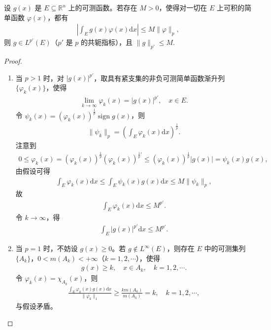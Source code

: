 \documentclass[../../main.tex]{subfiles}%
\begin{document}
\begin{theorem}\label{theorem:实变函数--定理6.19}
设 $g(x)$ 是 $E\subseteq\mathbb{R}^n$ 上的可测函数。若存在 $M>0$，使得对一切在 $E$ 上可积的简单函数 $\varphi(x)$，都有
\begin{align*}
\left| \int_E g(x)\varphi(x)\mathrm{d}x \right| \leqslant M \|\varphi\|_p,
\end{align*}
则 $g\in L^{p'}(E)$（$p'$ 是 $p$ 的共轭指标），且 $\|g\|_{p'}\leqslant M$.
\end{theorem}
\begin{proof}
\begin{enumerate}[(1)]
\item 当 $p>1$ 时，对 $|g(x)|^{p'}$，取具有紧支集的非负可测简单函数渐升列 $\{\varphi_k(x)\}$，使得
\begin{align*}
\lim_{k\to\infty} \varphi_k(x) = |g(x)|^{p'}, \quad x\in E.
\end{align*}
令 $\psi_k(x)=(\varphi_k(x))^{\frac{1}{p}} \operatorname{sign} g(x)$，则
\begin{align*}
\|\psi_k\|_p = \left( \int_E \varphi_k(x)\mathrm{d}x \right)^{\frac{1}{p}}.
\end{align*}
注意到
\begin{align*}
0 \leqslant \varphi_k(x) = (\varphi_k(x))^{\frac{1}{p}} (\varphi_k(x))^{\frac{1}{p}'} \leqslant (\varphi_k(x))^{\frac{1}{p}} |g(x)| = \psi_k(x)g(x),
\end{align*}
由假设可得
\begin{align*}
\int_E \varphi_k(x)\mathrm{d}x \leqslant \int_E \psi_k(x)g(x)\mathrm{d}x \leqslant M \|\psi_k\|_p,
\end{align*}
故
\begin{align*}
\int_E \varphi_k(x)\mathrm{d}x \leqslant M^{p'}.
\end{align*}
令 $k\to\infty$，得
\begin{align*}
\int_E |g(x)|^{p'} \mathrm{d}x \leqslant M^{p'}.
\end{align*}
\item 当 $p=1$ 时，不妨设 $g(x)\geqslant 0$。若 $g\notin L^\infty(E)$，则存在 $E$ 中的可测集列 $\{A_k\}$，$0<m(A_k)<+\infty$（$k=1,2,\cdots$），使得
\begin{align*}
g(x) \geqslant k, \quad x\in A_k, \quad k=1,2,\cdots.
\end{align*}
令 $\varphi_k(x)=\chi_{A_k}(x)$，则
\begin{align*}
\frac{\int_E \varphi_k(x)g(x)\mathrm{d}x}{\|\varphi_k\|_1} \geqslant \frac{k m(A_k)}{m(A_k)} = k, \quad k=1,2,\cdots,
\end{align*}
与假设矛盾。
\end{enumerate}

\end{proof}
\end{document}
